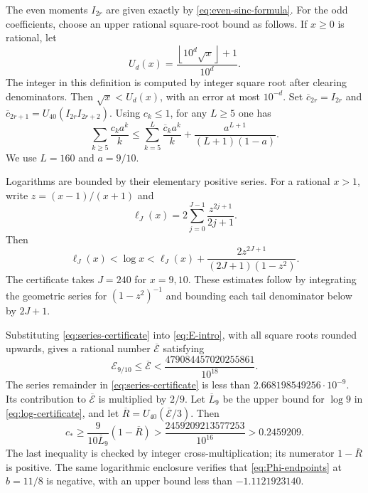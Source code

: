 \documentclass[11pt,reqno]{amsart}
\numberwithin{equation}{section}
\theoremstyle{definition}
\theoremstyle{remark}
\begin{document}
The even moments $I_{2r}$ are given exactly by
\eqref{eq:even-sinc-formula}. For the odd coefficients, choose an upper
rational square-root bound as follows. If $x\ge0$ is rational, let
\[
 U_d(x)=\frac{\left\lfloor10^d\sqrt{x}\right\rfloor+1}{10^d}.
\]
The integer in this definition is computed by integer square root after
clearing denominators. Then $\sqrt x<U_d(x)$, with an error at most
$10^{-d}$. Set $\overline c_{2r}=I_{2r}$ and
$\overline c_{2r+1}=U_{40}(I_{2r}I_{2r+2})$.
Using $c_k\le1$, for any $L\ge5$ one has
\begin{equation}\label{eq:series-certificate}
 \sum_{k\ge5}\frac{c_ka^k}{k}
 \le\sum_{k=5}^L\frac{\overline c_ka^k}{k}
        +\frac{a^{L+1}}{(L+1)(1-a)}.
\end{equation}
We use $L=160$ and $a=9/10$.

Logarithms are bounded by their elementary positive series. For a
rational $x>1$, write $z=(x-1)/(x+1)$ and
\[
 \ell_J(x)=2\sum_{j=0}^{J-1}\frac{z^{2j+1}}{2j+1}.
\]
Then
\begin{equation}\label{eq:log-certificate}
 \ell_J(x)<\log x
 <\ell_J(x)+\frac{2z^{2J+1}}{(2J+1)(1-z^2)}.
\end{equation}
The certificate takes $J=240$ for $x=9,10$. These estimates follow by
integrating the geometric series for $(1-z^2)^{-1}$ and bounding each
tail denominator below by $2J+1$.

Substituting \eqref{eq:series-certificate} into \eqref{eq:E-intro},
with all square roots rounded upwards, gives a rational number
$\overline{\mathcal E}$ satisfying
\begin{equation}\label{eq:E-certified}
 \mathcal E_{9/10}\le\overline{\mathcal E}
 <\frac{479084457020255861}{10^{18}}.
\end{equation}
The series remainder in \eqref{eq:series-certificate} is less than
$2.668198549256\cdot10^{-9}$. Its contribution to
$\overline{\mathcal E}$ is multiplied by $2/9$.
Let $\overline L_9$ be the upper bound for $\log9$ in
\eqref{eq:log-certificate}, and let
$\overline R=U_{40}(\overline{\mathcal E}/3)$. Then
\begin{equation}\label{eq:c-certified}
 c_*\ge\frac{9}{10\overline L_9}(1-\overline R)
 >\frac{2459209213577253}{10^{16}}>0.2459209.
\end{equation}
The last inequality is checked by integer cross-multiplication; its
numerator $1-\overline R$ is positive. The same logarithmic enclosure
verifies that \eqref{eq:Phi-endpoints} at $b=11/8$ is negative, with
an upper bound less than $-1.1121923140$.
\end{document}
